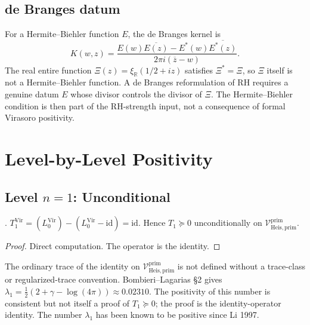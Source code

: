 \subsection{de Branges datum}
\label{v4-arith:vb:cycle:A6}

For a Hermite--Biehler function \(E\), the de Branges kernel is
\[
K(w,z)=\frac{E(w)\overline{E(z)}-E^{*}(w)\overline{E^{*}(z)}}
{2\pi i(\overline z-w)}.
\]
The real entire function
\(\Xi(z)=\xi_{\mathbb R}(1/2+iz)\) satisfies \(\Xi^{*}=\Xi\), so
\(\Xi\) itself is not a Hermite--Biehler function. A de Branges
reformulation of RH requires a genuine datum \(E\) whose divisor
controls the divisor of \(\Xi\). The Hermite--Biehler condition is then
part of the RH-strength input, not a consequence of formal Virasoro
positivity.

\section{Level-by-Level Positivity}
\label{v4-arith:vb:level-closure}

\subsection{Level \(n=1\): Unconditional}
\label{v4-arith:vb:n=1}

\begin{theorem}[\(n=1\) arithmetic Virasoro positivity]
\label{v4-arith:vb:thm:n=1}
\ClaimStatusProvedHere. \(T_{1}^{\mathrm{Vir}}=(L_{0}^{\mathrm{Vir}})-(L_{0}^{\mathrm{Vir}}-\mathrm{id})=\mathrm{id}\).
Hence \(T_{1}\succeq 0\) unconditionally on
\(\mathcal{V}^{\mathrm{prim}}_{\mathrm{Heis},\mathrm{prim}}\).
\end{theorem}

\begin{proof}
Direct computation. The operator is the identity.
\end{proof}

\begin{remark}
\label{v4-arith:vb:rem:n=1-consistency}
The ordinary trace of the identity on
\(\mathcal{V}^{\mathrm{prim}}_{\mathrm{Heis},\mathrm{prim}}\) is not
defined without a trace-class or regularized-trace convention.
Bombieri--Lagarias \S2 gives
\(\lambda_{1}=\tfrac{1}{2}(2+\gamma-\log(4\pi))\approx 0.02310\). The
positivity of this number is consistent but not itself a proof of
\(T_{1}\succeq 0\); the proof is the identity-operator identity.
The number \(\lambda_{1}\) has been known to be positive since Li 1997.
\end{remark}

